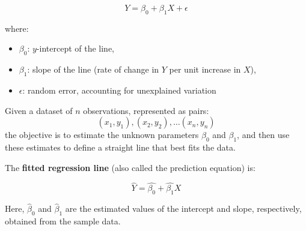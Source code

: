 \documentclass[twoside]{book}
\begin{document}
\begin{textbox}
\[
Y = \beta_0 + \beta_1 X + \epsilon
\]
\end{textbox}

where:
\begin{itemize}
    \item \( \beta_0 \): $y$-intercept of the line,
    \item \( \beta_1 \): slope of the line (rate of change in \( Y \) per unit increase in \( X \)),
    \item \( \epsilon \): random error, accounting for unexplained variation
\end{itemize}

Given a dataset of \( n \) observations, represented as pairs:
$$(x_1,y_1), (x_2, y_2), \dots (x_n, y_n)$$
the objective is to estimate the unknown parameters \( \beta_0 \) and \( \beta_1 \), and then use these estimates to define a straight line that best fits the data.

The \textbf{fitted regression line} (also called the prediction equation) is:
\begin{textbox}
    $$\hat{Y} = \hat{\beta_0} + \hat{\beta_1}X$$
\end{textbox}
Here, \( \hat{\beta}_0 \) and \( \hat{\beta}_1 \) are the estimated values of the intercept and slope, respectively, obtained from the sample data.

\begin{center}
\end{center}
\end{document}
